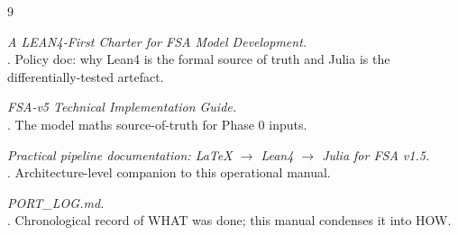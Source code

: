 \documentclass[11pt,a4paper]{article}
\begin{document}
\begin{thebibliography}{9}

  \emph{A LEAN4-First Charter for FSA Model Development.}
  \\.
  Policy doc: why Lean4 is the formal source of truth and Julia is
  the differentially-tested artefact.

  \emph{FSA-v5 Technical Implementation Guide.}
  \\.
  The model maths source-of-truth for Phase 0 inputs.

  \emph{Practical pipeline documentation: LaTeX $\to$ Lean4 $\to$ Julia
  for FSA v1.5.} \\.
  Architecture-level companion to this operational manual.

  \emph{PORT\_LOG.md.}
  \\.
  Chronological record of WHAT was done; this manual condenses it
  into HOW.

\end{thebibliography}
\end{document}
